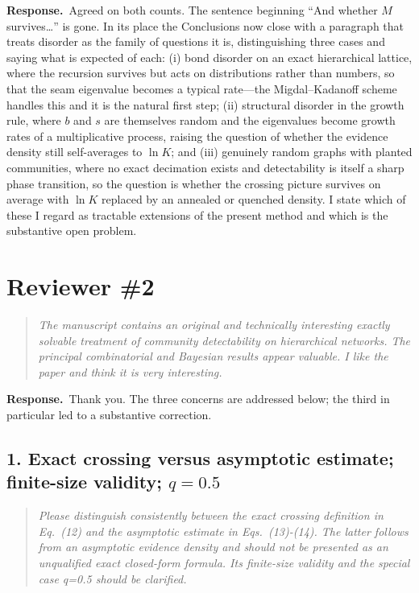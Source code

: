 \documentclass[11pt]{article}
\newenvironment{point}{\begin{quote}\itshape}{\end{quote}}
\newcommand{\reply}{\par\noindent\textbf{Response.}\ }
\begin{document}
\reply Agreed on both counts. The sentence beginning ``And whether $M$
survives\ldots'' is gone. In its place the Conclusions now close with a
paragraph that treats disorder as the family of questions it is, distinguishing
three cases and saying what is expected of each: (i) bond disorder on an exact
hierarchical lattice, where the recursion survives but acts on distributions
rather than numbers, so that the seam eigenvalue becomes a typical rate---the
Migdal--Kadanoff scheme handles this and it is the natural first step; (ii)
structural disorder in the growth rule, where $b$ and $s$ are themselves random
and the eigenvalues become growth rates of a multiplicative process, raising
the question of whether the evidence density still self-averages to $\ln K$;
and (iii) genuinely random graphs with planted communities, where no exact
decimation exists and detectability is itself a sharp phase transition, so the
question is whether the crossing picture survives on average with $\ln K$
replaced by an annealed or quenched density. I state which of these I regard as
tractable extensions of the present method and which is the substantive open
problem.

\section*{Reviewer \#2}

\begin{point}
The manuscript contains an original and technically interesting exactly
solvable treatment of community detectability on hierarchical networks. The
principal combinatorial and Bayesian results appear valuable. I like the paper
and think it is very interesting.
\end{point}

\reply Thank you. The three concerns are addressed below; the third in
particular led to a substantive correction.

\subsection*{1. Exact crossing versus asymptotic estimate; finite-size validity; $q=0.5$}

\begin{point}
Please distinguish consistently between the exact crossing definition in
Eq.~(12) and the asymptotic estimate in Eqs.~(13)-(14). The latter follows from
an asymptotic evidence density and should not be presented as an unqualified
exact closed-form formula. Its finite-size validity and the special case q=0.5
should be clarified.
\end{point}
\end{document}
